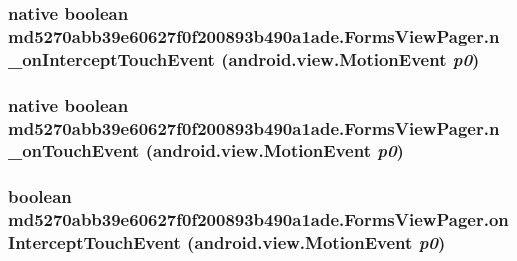 \hypertarget{classmd5270abb39e60627f0f200893b490a1ade_1_1_forms_view_pager_706a9c5163c73d9886ea08cb42e617ed}{
\subsubsection[{n\_\-onInterceptTouchEvent}]{\setlength{\rightskip}{0pt plus 5cm}native boolean md5270abb39e60627f0f200893b490a1ade.FormsViewPager.n\_\-onInterceptTouchEvent (android.view.MotionEvent {\em p0})}}
\label{classmd5270abb39e60627f0f200893b490a1ade_1_1_forms_view_pager_706a9c5163c73d9886ea08cb42e617ed}


\hypertarget{classmd5270abb39e60627f0f200893b490a1ade_1_1_forms_view_pager_250aed5e9b562880e22f64d879528867}{
\subsubsection[{n\_\-onTouchEvent}]{\setlength{\rightskip}{0pt plus 5cm}native boolean md5270abb39e60627f0f200893b490a1ade.FormsViewPager.n\_\-onTouchEvent (android.view.MotionEvent {\em p0})}}
\label{classmd5270abb39e60627f0f200893b490a1ade_1_1_forms_view_pager_250aed5e9b562880e22f64d879528867}


\hypertarget{classmd5270abb39e60627f0f200893b490a1ade_1_1_forms_view_pager_1ad288fa95e598ccb5cf989878fa5bbf}{
\subsubsection[{onInterceptTouchEvent}]{\setlength{\rightskip}{0pt plus 5cm}boolean md5270abb39e60627f0f200893b490a1ade.FormsViewPager.onInterceptTouchEvent (android.view.MotionEvent {\em p0})}}
\label{classmd5270abb39e60627f0f200893b490a1ade_1_1_forms_view_pager_1ad288fa95e598ccb5cf989878fa5bbf}


